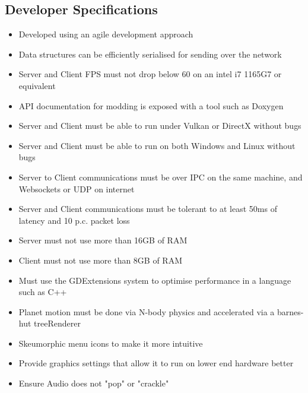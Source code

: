 \documentclass[12pt, DIV=calc]{scrartcl}
\newenvironment{alscape}[1]%
{%
    \begin{landscape}
}%
{%
    \end{landscape}
}
\begin{document}
\subsection{Developer Specifications}
\begin{itemize}
\item Developed using an agile development approach
\item Data structures can be efficiently serialised for sending over the network
\item Server and Client FPS must not drop below 60 on an intel i7 1165G7 or equivalent
\item API documentation for modding is exposed with a tool such as Doxygen
\item Server and Client must be able to run under Vulkan or DirectX without bugs
\item Server and Client must be able to run on both Windows and Linux without bugs
\item Server to Client communications must be over IPC on the same machine, and Websockets or UDP on internet
\item Server and Client communications must be tolerant to at least 50ms of latency and 10 p.c. packet loss
\item Server must not use more than 16GB of RAM
\item Client must not use more than 8GB of RAM
\item Must use the GDExtensions system to optimise performance in a language such as C++
\item Planet motion must be done via N-body physics and accelerated via a barnes-hut treeRenderer
\item Skeumorphic menu icons to make it more intuitive
\item Provide graphics settings that allow it to run on lower end hardware better
\item Ensure Audio does not "pop" or "crackle"
\end{itemize}
\begin{alscape}{DIV=8}
    \par{}%
    \begin{figure}[h!]
    \end{figure}
\end{alscape}
\end{document}
